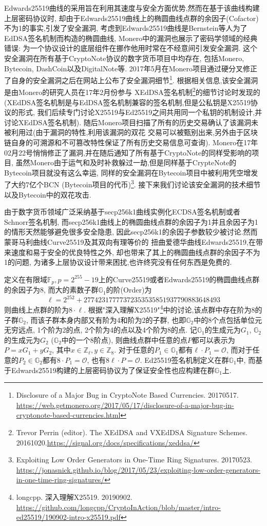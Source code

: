 \documentclass{article}
\renewcommand{\G}{\mathbb{G}}
\newcommand{\Z}{\mathbb{Z}}
\newcommand{\F}{\mathbb{F}}
\begin{document}
Edwards25519曲线的采用旨在利用其速度与安全方面优势,然而在基于该曲线构建上层密码协议时,
却由于Edwards25519曲线上的椭圆曲线点群的余因子(Cofactor)不为1的事实,引发了安全漏洞, 
考虑到Edwards25519曲线是Bernstein等人为了EdDSA签名机制而构造的椭圆曲线,
Monero中的漏洞也展示了密码学领域的经典错误:
为一个协议设计的底层组件在挪作他用时常在不经意间引发安全漏洞.
这个安全漏洞在所有基于CryptoNote协议的数字货币项目中均存在,
包括Monero, Bytecoin, DashCoin以及DigitalNote等. 
2017年5月在Monero项目通过硬分叉修正了自身的安全漏洞之后在网站上公布了安全漏洞细节\footnote{
Disclosure of a Major Bug in CryptoNote Based Currencies. 20170517.
\url{https://web.getmonero.org/2017/05/17/disclosure-of-a-major-bug-in-cryptonote-based-currencies.html}}. 根据相关信息,该安全漏洞是由Monero的研究人员在17年2月份参与
XEdDSA签名机制\footnote{Trevor Perrin (editor). The XEdDSA and VXEdDSA Signature Schemes. 20161020.\url{https://signal.org/docs/specifications/xeddsa/}}的细节讨论时发现的
(XEdDSA签名机制是与EdDSA签名机制兼容的签名机制,但是公私钥是X25519协议的形式, 
我们后续专门讨论X25519与Ed25519之间共用同一个私钥的机制设计,并讨论XEdDSA签名机制).
随后Monero项目扫描了所有的历史交易确认了该漏洞未被利用过(由于漏洞的特性,利用该漏洞的双花
交易可以被甄别出来,另外由于区块链自身的可溯源和不可篡改特性保证了所有历史交易信息可查询).
Monero在17年02月22号悄悄修正了漏洞,并在随后通知了所有基于CryptoNote的同样受影响的项目,
虽然Monero由于运气和及时补救躲过一劫,但是同样基于CrypteNote的Bytecoin项目就没有这么幸运,
同样的安全漏洞在Bytecoin项目中被利用凭空增发了大约7亿个BCN (Bytecoin项目的代币)\footnote{
Exploiting Low Order Generators in One-Time Ring Signatures. 20170523.
\url{https://jonasnick.github.io/blog/2017/05/23/exploiting-low-order-generators-in-one-time-ring-signatures/}}.
接下来我们讨论该安全漏洞的技术细节以及Bytecoin中的双花攻击.

由于数字货币领域广泛采纳基于secp256k1曲线实例化ECDSA签名机制或者Schnorr签名机制,
而secp256k1曲线上的椭圆曲线点群的余因子为1并且余因子为1的情形天然能够避免很多安全隐患,
因此secp256k1的余因子参数较少被讨论.然而蒙哥马利曲线Curve25519及其双向有理等价的
扭曲爱德华曲线Edwards25519,在带来速度和易于安全的优良特性之外,
却也带来了其上的椭圆曲线点群的余因子不为1的问题,
为诸多上层协议设计带来困扰,也许终究没有任何东西是免费的.

定义在有限域$\F_p, p = 2^{255}-19$上的Curve25519或者Edwards25519的椭圆曲线点群的余因子为8,
而大的素数子群$\G_1$的阶(Order)为
$$\ell = 2^{252} + 27742317777372353535851937790883648493$$
则曲线上点群的阶为$8\cdot\ell$. 根据"深入理解X25519"\footnote{
longcpp. 深入理解X25519. 20190902. 
\url{https://github.com/longcpp/CryptoInAction/blob/master/intro-ed25519/190902-intro-x25519.pdf}}中的讨论,该点群中存在阶为8的子群$\G_2$, 而该子群本身内部又有阶为4和阶为2的子群,
也即$\G_2$中的8个点包括单位元无穷远点, 1个阶为2的点, 2个阶为4的点以及4个阶为8的点.
记$\G_1$的生成元为$G_1$, $\G_2$的生成元为$G_2$ ($\G_2$中的一个8阶点), 
则曲线点群中任意的点$P$都可以表示为$P = xG_1 + yG_2$, 其中$x\in \Z_\ell, y\in\Z_8$. 
对于任意的$P_1 \in \G_1$都有$\ell \cdot P_1 = \mathcal{O}$, 
而对于任意的$P_2 \in \G_2$都有$8 \cdot P_1 = \mathcal{O}$, 
也有$8\ell\cdot P = \mathcal{O}$. Ed25519签名机制定义在群$\G_1$中, 
而基于Edwards25519构建的上层密码协议为了保证安全性也应构建在群$\G_1$上.
\end{document}
